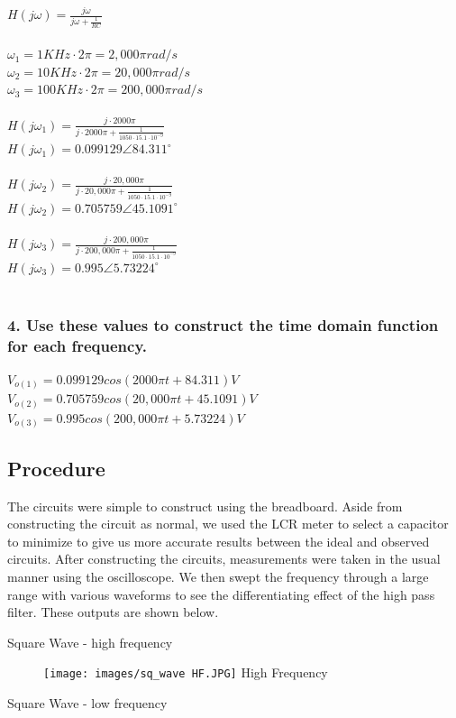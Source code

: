 \documentclass[11pt]{article}
\begin{document}
	$H(j\omega)=\frac{j\omega}{j\omega+\frac{1}{RC}}$\\\\
	$\omega_{1}=1KHz\cdot 2\pi=2,000\pi rad/s$\\
	$\omega_{2}=10KHz\cdot 2\pi=20,000\pi rad/s$\\
	$\omega_{3}=100KHz\cdot 2\pi=200,000\pi rad/s$\\\\
	$H(j\omega_{1})=\frac{j\cdot 2000\pi}{j\cdot 2000\pi+\frac{1}{1050\cdot 15.1 \cdot 10^{-9}}}$\\
	$H(j\omega_{1})=0.099129 \angle84.311^{\circ} $\\\\
	$H(j\omega_{2})=\frac{j\cdot 20,000\pi}{j\cdot 20,000\pi+\frac{1}{1050\cdot 15.1 \cdot 10^{-9}}}$\\
	$H(j\omega_{2})=0.705759 \angle45.1091^{\circ} $\\\\	
	$H(j\omega_{3})=\frac{j\cdot 200,000\pi}{j\cdot 200,000\pi+\frac{1}{1050\cdot 15.1 \cdot 10^{-9}}}$\\
	$H(j\omega_{3})=0.995 \angle5.73224^{\circ} $\\\\
	
	\subsubsection*{4. Use these values to construct the time domain function for each frequency.}
	
	$V_{o(1)}=0.099129cos(2000\pi t+84.311)V$\\
	$V_{o(2)}=0.705759cos(20,000\pi t+45.1091)V$\\
	$V_{o(3)}=0.995cos(200,000\pi t+5.73224)V$\\
		\subsection*{Procedure}
	The circuits were simple to construct using the breadboard. Aside from constructing the circuit as normal, we used the LCR meter to select a capacitor to minimize to give us more accurate results between the ideal and observed circuits. After constructing the circuits, measurements were taken in the usual manner using the oscilloscope. We then swept the frequency through a large range with various waveforms to see the differentiating effect of the high pass filter. These outputs are shown below.
	
	
	Square Wave - high frequency
	\begin{figure}[H]
		\centering
		\texttt{[image: images/sq\_wave HF.JPG]}
		High Frequency
	\end{figure}
	Square Wave - low frequency
	
\end{document}
